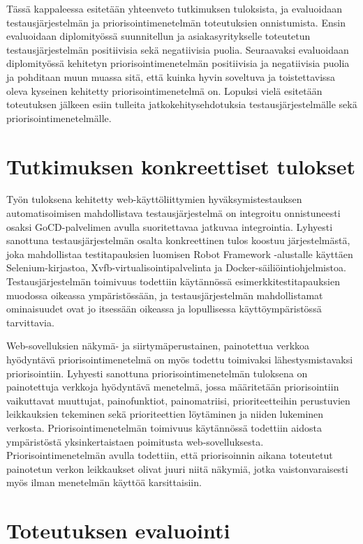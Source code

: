 Tässä kappaleessa esitetään yhteenveto tutkimuksen tuloksista, ja evaluoidaan testausjärjestelmän ja priorisointimenetelmän toteutuksien onnistumista.
Ensin evaluoidaan diplomityössä suunnitellun ja asiakasyritykselle toteutetun testausjärjestelmän positiivisia sekä negatiivisia puolia.
Seuraavaksi evaluoidaan diplomityössä kehitetyn priorisointimenetelmän positiivisia ja negatiivisia puolia ja pohditaan muun muassa sitä, että kuinka hyvin soveltuva ja toistettavissa oleva kyseinen kehitetty priorisointimenetelmä on.
Lopuksi vielä esitetään toteutuksen jälkeen esiin tulleita jatkokehitysehdotuksia testausjärjestelmälle sekä priorisointimenetelmälle.

\section{Tutkimuksen konkreettiset tulokset} \label{ch:12_tutkimuksen_konkreettiset_tulokset}

  Työn tuloksena kehitetty  web-käyttöliittymien hyväksymistestauksen automatisoimisen mahdollistava testausjärjestelmä on integroitu onnistuneesti osaksi GoCD-palvelimen avulla suoritettavaa jatkuvaa integrointia.
  Lyhyesti sanottuna testausjärjestelmän osalta konkreettinen tulos koostuu järjestelmästä, joka mahdollistaa testitapauksien luomisen Robot Framework -alustalle käyttäen Selenium-kirjastoa, Xvfb-virtualisointipalvelinta ja Docker-säiliöintiohjelmistoa.
  Testausjärjestelmän toimivuus todettiin käytännössä esimerkkitestitapauksien muodossa oikeassa ympäristössään, ja testausjärjestelmän mahdollistamat ominaisuudet ovat jo itsessään oikeassa ja lopullisessa käyttöympäristössä tarvittavia.

  Web-sovelluksien näkymä- ja siirtymäperustainen, painotettua verkkoa hyödyntävä priorisointimenetelmä on myös todettu toimivaksi lähestysmistavaksi priorisointiin.
  Lyhyesti sanottuna priorisointimenetelmän tuloksena on painotettuja verkkoja hyödyntävä menetelmä, jossa määritetään priorisointiin vaikuttavat muuttujat, painofunktiot, painomatriisi, prioriteetteihin perustuvien leikkauksien tekeminen sekä prioriteettien löytäminen ja niiden lukeminen verkosta.
  Priorisointimenetelmän toimivuus käytännössä todettiin aidosta ympäristöstä yksinkertaistaen poimitusta web-sovelluksesta.
  Priorisointimenetelmän avulla todettiin, että priorisoinnin aikana toteutetut painotetun verkon leikkaukset olivat juuri niitä näkymiä, jotka vaistonvaraisesti myös ilman menetelmän käyttöä karsittaisiin.

\section{Toteutuksen evaluointi} \label{ch:12_toteutuksen_evaluointi}

